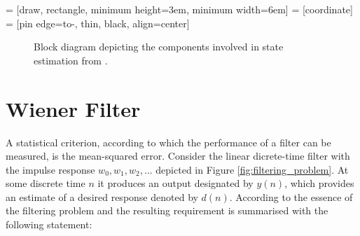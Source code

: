  = [draw, rectangle, minimum height=3em, minimum width=6em]
 = [coordinate]
 = [pin edge={to-, thin, black}, align=center]

\begin{figure}
\centering
{}
\caption{Block diagram depicting the components involved in state estimation from \cite{haykin2002adaptive}.} \label{fig:state_estimation}
\end{figure}

\section{Wiener Filter}

A statistical criterion, according to which the performance of a filter can be measured, is the mean-squared error. Consider the linear dicrete-time filter with the impulse response $w_0, w_1, w_2, \dots$ depicted in Figure \ref{fig:filtering_problem}. At some discrete time $n$ it produces an output designated by $y(n)$, which provides an estimate of a desired response denoted by $d(n)$. According to \citeauthor{haykin2002adaptive} \cite{haykin2002adaptive} the essence of the filtering problem and the resulting requirement is summarised with the following statement:

